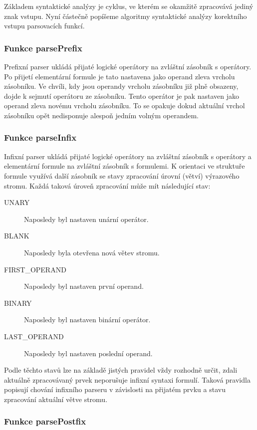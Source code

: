 \documentclass[thesis=B,czech,hidelinks]{thesis}[2012/06/26]
\begin{document}
Základem syntaktické analýzy je cyklus, ve kterém se okamžitě zpracovává jediný znak vstupu. Nyní částečně popíšeme algoritmy syntaktické analýzy korektního vstupu parsovacích funkcí.

\subsubsection{Funkce parsePrefix}

Prefixní parser ukládá přijaté logické operátory na zvláštní zásobník s operátory. Po přijetí elementární formule je tato nastavena jako operand zleva vrcholu zásobníku. Ve chvíli, kdy jsou operandy vrcholu zásobníku již plně obsazeny, dojde k sejmutí operátoru ze zásobníku. Tento operátor je pak nastaven jako operand zleva novému vrcholu zásobníku. To se opakuje dokud aktuální vrchol zásobníku opět nedisponuje alespoň jedním volným operandem.

\subsubsection{Funkce parseInfix}

Infixní parser ukládá přijaté logické operátory na zvláštní zásobník s operátory a elementární formule na zvláštní zásobník s formulemi. K orientaci ve struktuře formule využívá další zásobník se stavy zpracování úrovní (větví) výrazového stromu. Každá taková úroveň zpracování může mít následující stav:

\begin{description}
	\item[UNARY] Naposledy byl nastaven unární operátor. 
	\item[BLANK] Naposledy byla otevřena nová větev stromu.
	\item[FIRST\_OPERAND] Naposledy byl nastaven první operand.
	\item[BINARY] Naposledy byl nastaven binární operátor.
	\item[LAST\_OPERAND] Naposledy byl nastaven poslední operand.
\end{description}

Podle těchto stavů lze na základě jistých pravidel vždy rozhodně určit, zdali aktuálně zpracovávaný prvek neporušuje infixní syntaxi formulí. Taková pravidla popisují chování infixního parseru v závislosti na přijatém prvku a stavu zpracování aktuální větve stromu.

\subsubsection{Funkce parsePostfix}
\end{document}
